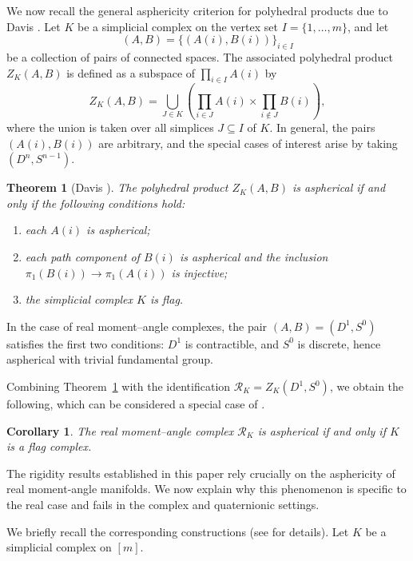 \documentclass[11pt,a4paper]{article}
\numberwithin{equation}{section}
\newtheorem{thm}[definition]{Theorem}
\newtheorem{cor}[definition]{Corollary}
\theoremstyle{named}
\begin{document}
\medskip

We now recall the general asphericity criterion for polyhedral products due to Davis \cite{rafca}. Let $K$ be a simplicial complex on the vertex set $I=\{1,\dots,m\}$, and let
\[
(A,B)=\{(A(i),B(i))\}_{i\in I}
\]
be a collection of pairs of connected spaces. The associated polyhedral product $Z_K(A,B)$ is defined as a subspace of $\prod_{i\in I} A(i)$ by
\[
Z_K(A,B)
=
\bigcup_{J\in K}
\left(
\prod_{i\in J} A(i)\times \prod_{i\notin J} B(i)
\right),
\]
where the union is taken over all simplices $J\subseteq I$ of $K$. In general, the pairs $(A(i),B(i))$ are arbitrary, and the special cases of interest arise by taking $(D^n,S^{n-1})$.

\begin{thm}[Davis {\cite[Theorem 2.22]{rafca}}]
\label{thm:Davis_aspherical}
The polyhedral product $Z_K(A,B)$ is aspherical if and only if the following
conditions hold:
\begin{enumerate}
    \item[(i)] each $A(i)$ is aspherical;
    \item[(ii)] each path component of $B(i)$ is aspherical and the inclusion $\pi_1(B(i)) \to \pi_1(A(i))$ is injective;
    \item[(iii)] the simplicial complex $K$ is flag.
\end{enumerate}
\end{thm}

In the case of real moment--angle complexes, the pair $(A,B)=(D^1,S^0)$ satisfies the first two conditions: $D^1$ is contractible, and $S^0$ is discrete, hence aspherical with trivial fundamental group.

Combining Theorem~\ref{thm:Davis_aspherical} with the identification $\mathcal{R}_K = Z_K(D^1,S^0)$, we obtain the following, which can be considered a special case of \cite[Proposition 4.5]{rafca}.

\begin{cor}
\label{cor:real_MA_aspherical}
The real moment--angle complex $\mathcal{R}_K$ is aspherical if and only if $K$ is a flag complex.
\end{cor}

The rigidity results established in this paper rely crucially on the asphericity of real moment-angle manifolds. We now explain why this phenomenon is specific to the real case and fails in the complex and quaternionic settings.

We briefly recall the corresponding constructions (see \cite{tt,ho} for details). Let $K$ be a simplicial complex on $[m]$.
\end{document}

